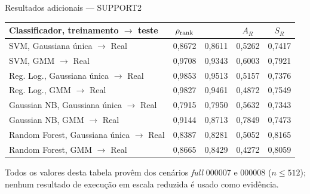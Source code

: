 \begin{frame}{Resultados adicionais — SUPPORT2}
  \vspace{0.14cm}
  \centering
  \renewcommand{\arraystretch}{1.12}
  \fontsize{7.8}{9.4}\selectfont
  \begin{tabular}{lcccc}
    \toprule
    Classificador, treinamento $\rightarrow$ teste & $\rho_{\mathrm{rank}}$ & \AW{} & $A_R$ & $S_R$ \\
    \midrule
    SVM, Gaussiana única $\rightarrow$ Real & 0,8672 & 0,8611 & 0,5262 & 0,7417 \\
    SVM, GMM $\rightarrow$ Real & 0,9708 & 0,9343 & 0,6003 & 0,7921 \\
    Reg. Log., Gaussiana única $\rightarrow$ Real & 0,9853 & 0,9513 & 0,5157 & 0,7376 \\
    Reg. Log., GMM $\rightarrow$ Real & 0,9827 & 0,9461 & 0,4872 & 0,7549 \\
    Gaussian NB, Gaussiana única $\rightarrow$ Real & 0,7915 & 0,7950 & 0,5632 & 0,7343 \\
    Gaussian NB, GMM $\rightarrow$ Real & 0,9144 & 0,8713 & 0,7849 & 0,7473 \\
    Random Forest, Gaussiana única $\rightarrow$ Real & 0,8387 & 0,8281 & 0,5052 & 0,8165 \\
    Random Forest, GMM $\rightarrow$ Real & 0,8665 & 0,8429 & 0,4272 & 0,8059 \\
    \bottomrule
  \end{tabular}

  \vspace{0.18cm}
  {\fontsize{8.0}{9.6}\selectfont\color{CoInfoGray}
    Todos os valores desta tabela provêm dos cenários \textit{full} 000007 e 000008 ($n\leq512$); nenhum resultado de execução em escala reduzida é usado como evidência.\par}
\end{frame}

